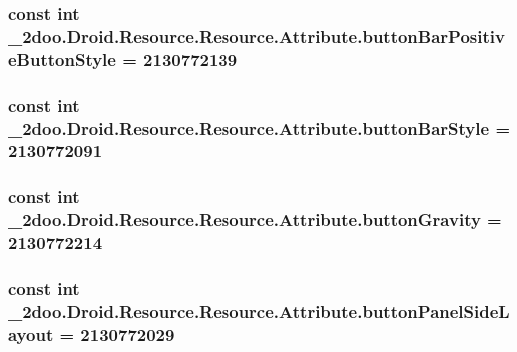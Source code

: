 \hypertarget{class__2doo_1_1_droid_1_1_resource_1_1_attribute_6ad2c9a649b968d7aa196c91006319e5}{
\subsubsection[{buttonBarPositiveButtonStyle}]{\setlength{\rightskip}{0pt plus 5cm}const int \_\-2doo.Droid.Resource.Resource.Attribute.buttonBarPositiveButtonStyle = 2130772139}}
\label{class__2doo_1_1_droid_1_1_resource_1_1_attribute_6ad2c9a649b968d7aa196c91006319e5}


\hypertarget{class__2doo_1_1_droid_1_1_resource_1_1_attribute_e60d096e478f46613697da4c3dac5953}{
\subsubsection[{buttonBarStyle}]{\setlength{\rightskip}{0pt plus 5cm}const int \_\-2doo.Droid.Resource.Resource.Attribute.buttonBarStyle = 2130772091}}
\label{class__2doo_1_1_droid_1_1_resource_1_1_attribute_e60d096e478f46613697da4c3dac5953}


\hypertarget{class__2doo_1_1_droid_1_1_resource_1_1_attribute_90681bee86e7dbcc3de833257519d99a}{
\subsubsection[{buttonGravity}]{\setlength{\rightskip}{0pt plus 5cm}const int \_\-2doo.Droid.Resource.Resource.Attribute.buttonGravity = 2130772214}}
\label{class__2doo_1_1_droid_1_1_resource_1_1_attribute_90681bee86e7dbcc3de833257519d99a}


\hypertarget{class__2doo_1_1_droid_1_1_resource_1_1_attribute_72bb77bea81521f10e48f0efc7fea11a}{
\subsubsection[{buttonPanelSideLayout}]{\setlength{\rightskip}{0pt plus 5cm}const int \_\-2doo.Droid.Resource.Resource.Attribute.buttonPanelSideLayout = 2130772029}}
\label{class__2doo_1_1_droid_1_1_resource_1_1_attribute_72bb77bea81521f10e48f0efc7fea11a}


